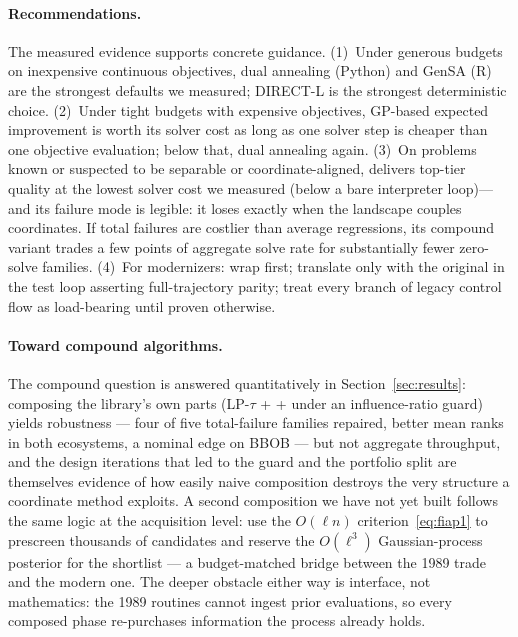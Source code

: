 \paragraph{Recommendations.} The measured evidence supports concrete
guidance. (1)~Under generous budgets on inexpensive continuous objectives,
dual annealing (Python) and GenSA (R) are the strongest defaults we
measured; DIRECT-L is the strongest deterministic choice. (2)~Under
tight budgets with expensive objectives, GP-based expected improvement
is worth its solver cost as long as one solver step is cheaper than
one objective evaluation; below that, dual annealing again.
(3)~On problems known or suspected to be separable or coordinate-aligned,
 delivers top-tier quality at the lowest solver cost we
measured (below a bare interpreter loop)---and its failure mode is
legible: it loses exactly when the landscape couples coordinates. If
total failures are costlier than average regressions, its compound
variant  trades a few points of aggregate solve rate
for substantially fewer zero-solve families.
(4)~For modernizers: wrap first; translate only with the original in
the test loop asserting full-trajectory parity; treat every branch of
legacy control flow as load-bearing until proven otherwise.

\paragraph{Toward compound algorithms.} The compound question is
answered quantitatively in Section~\ref{sec:results}: composing the
library's own parts (LP-$\tau$ +  +  under
an influence-ratio guard) yields robustness --- four of five
total-failure families repaired, better mean ranks in both ecosystems,
a nominal edge on BBOB --- but not aggregate throughput, and the design iterations
that led to the guard and the portfolio split are themselves evidence
of how easily naive composition destroys the very structure a
coordinate method exploits. A second composition we have not yet built
follows the same logic at the acquisition level: use the $O(\ell n)$
criterion~\eqref{eq:fiap1} to prescreen thousands of candidates and
reserve the $O(\ell^3)$ Gaussian-process posterior for the
shortlist --- a budget-matched bridge between the 1989 trade and the
modern one. The deeper obstacle either way is interface, not
mathematics: the 1989 routines cannot ingest prior evaluations, so
every composed phase re-purchases information the process already
holds.

